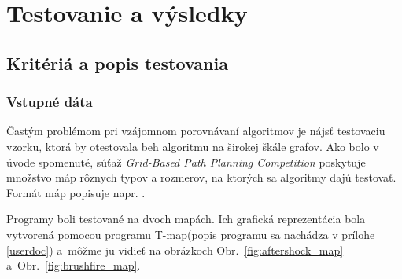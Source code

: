 \chapter{Testovanie a výsledky}

\section{Kritériá a popis testovania}
\subsection{Vstupné dáta}
Častým problémom pri vzájomnom porovnávaní algoritmov je
nájsť testovaciu vzorku, ktorá by otestovala beh algoritmu na širokej škále grafov.
Ako bolo v úvode spomenuté, súťaž {\sl Grid-Based Path Planning Competition} poskytuje množstvo máp rôznych typov a rozmerov,
na ktorých sa algoritmy dajú testovať. Formát máp popisuje napr. \cite{sturtevant2012benchmarks}.

Programy boli testované na dvoch mapách. Ich grafická reprezentácia bola 
vytvorená pomocou programu T-map(popis programu sa nachádza v prílohe \ref{userdoc}) 
a~môžme ju vidieť na obrázkoch Obr.~\ref{fig:aftershock_map} a~Obr.~\ref{fig:brushfire_map}.

